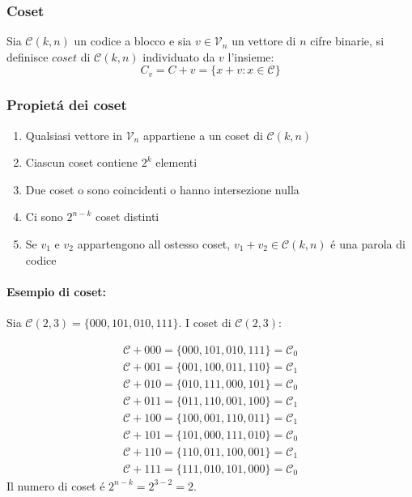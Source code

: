         \subsubsection{Coset}
            Sia $\mathcal{C}(k,n)$ un codice a blocco e sia $v\in \mathcal{V}_n$ un vettore di $n$ cifre binarie, si definisce $coset$ di
            $\mathcal{C}(k,n)$ individuato da $v$ l'insieme:
            \[
                C_v = C+v=\{ x+v: x\in\mathcal{C} \}
            \]
        \subsubsection{Propietá dei coset}
            \begin{enumerate}
                \item {Qualsiasi vettore in $\mathcal{V}_n$ appartiene a un coset di $\mathcal{C}(k,n)$}
                \item {Ciascun coset contiene $2^k$ elementi}
                \item {Due coset o sono coincidenti o hanno intersezione nulla}
                \item {Ci sono $2^{n-k}$ coset distinti}
                \item {Se $v_1$ e $v_2$ appartengono all ostesso coset, $v_1 + v_2 \in \mathcal{C}(k,n)$ é una parola di codice}
            \end{enumerate}
            \paragraph{Esempio di coset:}
                \begin{sloppypar}
                    Sia ${\mathcal{C}(2,3) = \{000,101,010,111\}}$. I coset di ${\mathcal{C}(2,3)}$: 
                \end{sloppypar}
                \begin{align}
                    \mathcal{C} + 000 = \{000,101,010,111\} = \mathcal{C}_0 \\
                    \mathcal{C} + 001 = \{001,100,011,110\} = \mathcal{C}_1 \\
                    \mathcal{C} + 010 = \{010,111,000,101\} = \mathcal{C}_0 \\
                    \mathcal{C} + 011 = \{011,110,001,100\} = \mathcal{C}_1 \\
                    \mathcal{C} + 100 = \{100,001,110,011\} = \mathcal{C}_1 \\
                    \mathcal{C} + 101 = \{101,000,111,010\} = \mathcal{C}_0 \\
                    \mathcal{C} + 110 = \{110,011,100,001\} = \mathcal{C}_1 \\
                    \mathcal{C} + 111 = \{111,010,101,000\} = \mathcal{C}_0 
                \end{align}
                Il numero di coset é $2^{n-k} = 2^{3-2} =2$.

